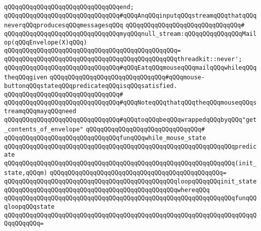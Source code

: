 \newline
\verb|qQQqqQQqqQQqqQQqqQQqqQQqqQQqqQQqend;|\newline
\newline
\verb|qQQqqQQqqQQqqQQqqQQqqQQqqQQqqQQq#qQQqAnqQQqinputqQQqstreamqQQqthatqQQqneverqQQqproducesqQQqmessagesqQQq|\newline
\verb|qQQqqQQqqQQqqQQqqQQqqQQqqQQqqQQq#|\newline
\verb|qQQqqQQqqQQqqQQqqQQqqQQqqQQqqQQqmyqQQqnull_stream:qQQqqQQqqQQqqQQqMailop(qQQqEnvelope(X)qQQq)|\newline
\verb|qQQqqQQqqQQqqQQqqQQqqQQqqQQqqQQqqQQqqQQqqQQqqQQq=|\newline
\verb|qQQqqQQqqQQqqQQqqQQqqQQqqQQqqQQqqQQqqQQqqQQqqQQqthreadkit::never';|\newline
\newline
\verb|qQQqqQQqqQQqqQQqqQQqqQQqqQQqqQQq#qQQqEatqQQqmouseqQQqmailqQQqwhileqQQqtheqQQqgiven|\newline
\verb|qQQqqQQqqQQqqQQqqQQqqQQqqQQqqQQq#qQQqmouse-buttonqQQqstateqQQqpredicateqQQqisqQQqsatisfied.|\newline
\verb|qQQqqQQqqQQqqQQqqQQqqQQqqQQqqQQq#|\newline
\verb|qQQqqQQqqQQqqQQqqQQqqQQqqQQqqQQq#qQQqNoteqQQqthatqQQqtheqQQqmouseqQQqstreamqQQqmayqQQqneed|\newline
\verb|qQQqqQQqqQQqqQQqqQQqqQQqqQQqqQQq#qQQqtoqQQqbeqQQqwrappedqQQqbyqQQq"get_contents_of_envelope"|\newline
\verb|qQQqqQQqqQQqqQQqqQQqqQQqqQQqqQQq#|\newline
\verb|qQQqqQQqqQQqqQQqqQQqqQQqqQQqqQQqfunqQQqwhile_mouse_state|\newline
\verb|qQQqqQQqqQQqqQQqqQQqqQQqqQQqqQQqqQQqqQQqqQQqqQQqqQQqqQQqqQQqqQQqpredicate|\newline
\verb|qQQqqQQqqQQqqQQqqQQqqQQqqQQqqQQqqQQqqQQqqQQqqQQqqQQqqQQqqQQqqQQq(init_state,qQQqm)|\newline
\verb|qQQqqQQqqQQqqQQqqQQqqQQqqQQqqQQqqQQqqQQqqQQqqQQq=|\newline
\verb|qQQqqQQqqQQqqQQqqQQqqQQqqQQqqQQqqQQqqQQqqQQqqQQqloopqQQqqQQqinit_state|\newline
\verb|qQQqqQQqqQQqqQQqqQQqqQQqqQQqqQQqqQQqqQQqqQQqqQQqwhereqQQq|\newline
\newline
\verb|qQQqqQQqqQQqqQQqqQQqqQQqqQQqqQQqqQQqqQQqqQQqqQQqqQQqqQQqqQQqqQQqfunqQQqloopqQQqstate|\newline
\verb|qQQqqQQqqQQqqQQqqQQqqQQqqQQqqQQqqQQqqQQqqQQqqQQqqQQqqQQqqQQqqQQqqQQqqQQqqQQqqQQq=|\newline
